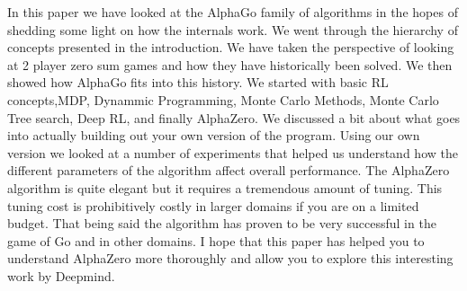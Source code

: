 
In this paper we have looked at the AlphaGo family of algorithms in the hopes of shedding some light on how the internals work. We went through the hierarchy of concepts presented in the introduction.  We have taken the perspective of looking at 2 player zero sum games and how they have historically been solved. We then showed how AlphaGo fits into this history. We started with basic RL concepts,MDP, Dynammic Programming, Monte Carlo Methods, Monte Carlo Tree search, Deep RL, and finally AlphaZero. We discussed a bit about what goes into actually building out your own version of the program. Using our own version we looked at a number of experiments that helped us understand how the different parameters of the algorithm affect overall performance. The AlphaZero algorithm is quite elegant but it requires a tremendous amount of tuning. This tuning cost is prohibitively costly in larger domains if you are on a limited budget. That being said the algorithm has proven to be very successful in the game of Go and in other domains. I hope that this paper has helped you to understand AlphaZero more thoroughly and allow you to explore this interesting work by Deepmind. 
